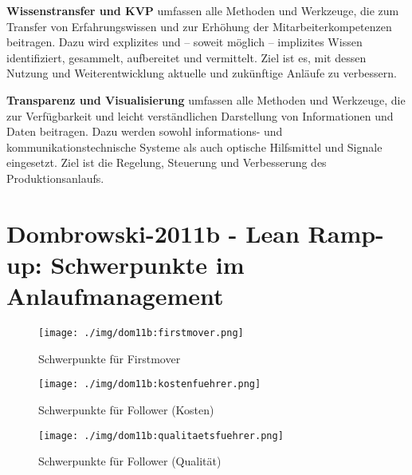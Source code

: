  \textbf{Wissenstransfer und KVP} umfassen
alle Methoden und Werkzeuge, die
zum Transfer von Erfahrungswissen
und zur Erhöhung der Mitarbeiterkompetenzen beitragen. Dazu wird
explizites und – soweit möglich – implizites Wissen identifiziert, gesammelt, aufbereitet und vermittelt. Ziel
ist es, mit dessen Nutzung und
Weiterentwicklung aktuelle und zukünftige Anläufe zu verbessern.

 \textbf{Transparenz und Visualisierung} umfassen alle Methoden und Werkzeuge,
die zur Verfügbarkeit und leicht verständlichen Darstellung von Informationen und Daten beitragen. Dazu
werden sowohl informations- und
kommunikationstechnische Systeme
als auch optische Hilfsmittel und Signale eingesetzt. Ziel ist die Regelung,
Steuerung und Verbesserung des Produktionsanlaufs.

\newpage

\section{Dombrowski-2011b - Lean Ramp-up: Schwerpunkte im Anlaufmanagement}
\begin{figure}[h!]
 \centering
 \texttt{[image: ./img/dom11b:firstmover.png]}
 \caption[Schwerpunkte für Firstmover]{Schwerpunkte für Firstmover \autocite{Dombrowski2011b}}
 \label{fig:dom11b:firstmover}
% 
% 
 \centering
 \texttt{[image: ./img/dom11b:kostenfuehrer.png]}
 \caption[Schwerpunkte für Follower (Kosten)]{Schwerpunkte für Follower (Kosten) \autocite{Dombrowski2011b}}
 \label{fig:dom11b:kostenfuehrer}
% 
% 
 \centering
 \texttt{[image: ./img/dom11b:qualitaetsfuehrer.png]}
 \caption[Schwerpunkte für Follower (Qualität)]{Schwerpunkte für Follower (Qualität) \autocite{Dombrowski2011b}}
 \label{fig:dom11b:qualitaetsfuehrer}
\end{figure}
\restoregeometry